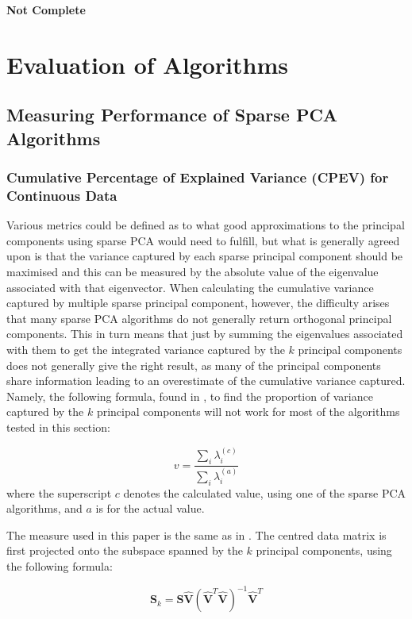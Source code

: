 \documentclass[11pt,a4paper]{article}
\begin{document}
\textbf{Not Complete}
\clearpage

\section{Evaluation of Algorithms}
\subsection{Measuring Performance of Sparse PCA Algorithms}

\subsubsection{Cumulative Percentage of Explained Variance (CPEV) for Continuous Data}
Various metrics could be defined as to what good approximations to the principal components using sparse PCA would need to fulfill, but what is generally agreed upon is that the variance captured by each sparse principal component should be maximised and this can be measured by the absolute value of the eigenvalue associated with that eigenvector. When calculating the cumulative variance captured by multiple sparse principal component, however, the difficulty arises that many sparse PCA algorithms do not generally return orthogonal principal components. This in turn means that just by summing the eigenvalues associated with them to get the integrated variance captured by the $k$ principal components does not generally give the right result, as many of the principal components share information leading to an overestimate of the cumulative variance captured. Namely, the following formula, found in \cite{dimakis}, to find the proportion of variance captured by the $k$ principal components will not work for most of the algorithms tested in this section:

\begin{equation*}
v = \frac{\sum_{i}\lambda^{(c)}_i}{\sum_{i}\lambda^{(a)}_i}
\end{equation*}
where the superscript $c$ denotes the calculated value, using one of the sparse PCA algorithms, and $a$ is for the actual value.

The measure used in this paper is the same as in \cite{shen}. The centred data matrix is first projected onto the subspace spanned by the $k$ principal components, using the following formula:

\begin{equation}
\mathbf{S}_k = \mathbf{S}\mathbf{\hat{V}}\left(\mathbf{\hat{V}}^T\mathbf{\hat{V}}\right)^{-1} \mathbf{\hat{V}}^T
\label{captured_var}
\end{equation}
\end{document}
